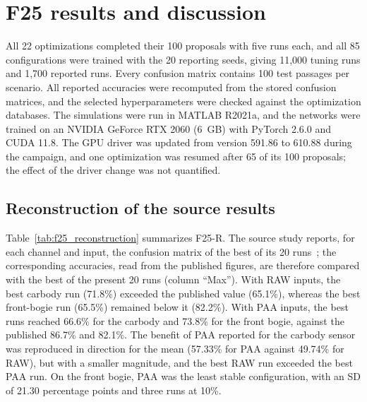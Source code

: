\section{F25 results and discussion}
\label{sec:f25_results}

All 22 optimizations completed their 100 proposals with five runs each, and all
85 configurations were trained with the 20 reporting seeds, giving 11,000
tuning runs and 1,700 reported runs. Every confusion matrix contains 100 test
passages per scenario. All reported accuracies were recomputed from the stored
confusion matrices, and the selected hyperparameters were checked against the
optimization databases. The simulations were run in MATLAB R2021a, and the
networks were trained on an NVIDIA GeForce RTX 2060 (6~GB) with PyTorch 2.6.0
and CUDA 11.8. The GPU driver was updated from version 591.86 to 610.88 during
the campaign, and one optimization was resumed after 65 of its 100 proposals;
the effect of the driver change was not quantified.

\subsection{Reconstruction of the source results}

Table~\ref{tab:f25_reconstruction} summarizes F25-R. The source study reports,
for each channel and input, the confusion matrix of the best of its 20
runs~\cite{fernandes2025early}; the corresponding accuracies, read from the
published figures, are therefore compared with the best of the present 20 runs
(column ``Max''). With RAW inputs, the best carbody run (71.8\%) exceeded the
published value (65.1\%), whereas the best front-bogie run (65.5\%) remained
below it (82.2\%). With PAA inputs, the best runs reached 66.6\% for the carbody
and 73.8\% for the front bogie, against the published 86.7\% and 82.1\%. The
benefit of PAA reported for the carbody sensor was reproduced in direction for
the mean (57.33\% for PAA against 49.74\% for RAW), but with a smaller
magnitude, and the best RAW run exceeded the best PAA run. On the front bogie,
PAA was the least stable configuration, with an SD of 21.30 percentage points
and three runs at 10\%.

\begin{table}[htbp]
\centering
\caption{F25-R ten-class test accuracy over 20 initialization seeds. SD is the
sample standard deviation in percentage points. The last column gives the
accuracy of the best of 20 runs in the source study, read approximately from
its published confusion matrices~\cite{fernandes2025early}.}
\label{tab:f25_reconstruction}
\small

\end{table}

